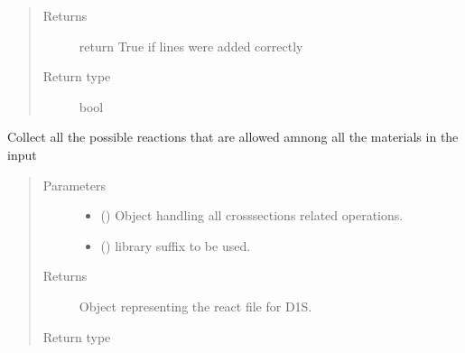\documentclass[letterpaper,10pt,english]{sphinxmanual}
\begin{document}
\begin{fulllineitems}
\begin{fulllineitems}
\begin{quote}
\begin{description}
\item[{Returns}] \leavevmode
\sphinxAtStartPar
return True if lines were added correctly

\item[{Return type}] \leavevmode
\sphinxAtStartPar
bool

\end{description}\end{quote}

\end{fulllineitems}


\begin{fulllineitems}
\label{\detokenize{api/inputgeneration:inputfile.D1S_Input.get_reaction_file}}
\sphinxAtStartPar
Collect all the possible reactions that are allowed amnong all the
materials in the input
\begin{quote}\begin{description}
\item[{Parameters}] \leavevmode\begin{itemize}
\item {} 
\sphinxAtStartPar
{} ({\hyperref[\detokenize{api/initobjects:libmanager.LibManager}]{}}) \textendash{} Object handling all cross\sphinxhyphen{}sections related operations.

\item {} 
\sphinxAtStartPar
{} () \textendash{} library suffix to be used.

\end{itemize}

\item[{Returns}] \leavevmode
\sphinxAtStartPar
Object representing the react file for D1S.

\item[{Return type}] \leavevmode
\sphinxAtStartPar
{\hyperref[\detokenize{api/inputgeneration:parsersD1S.ReactionFile}]{}}

\end{description}\end{quote}


\end{fulllineitems}
\end{fulllineitems}
\end{document}
